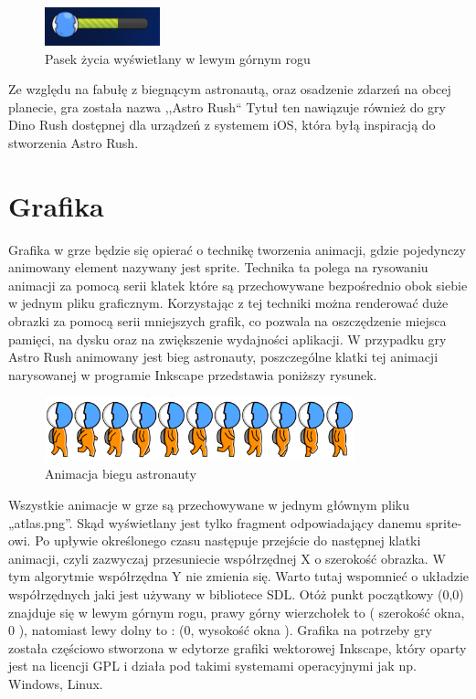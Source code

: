 \begin{figure}[h]
    \centering
    \includegraphics[height=42px]{./Pictures/livebar.png}
    \caption{Pasek życia wyświetlany w lewym górnym rogu}
\end{figure}

Ze względu na fabułę z biegnącym astronautą, oraz osadzenie zdarzeń na obcej planecie, gra została nazwa ,,Astro Rush`` Tytuł ten nawiązuje również do gry Dino Rush dostępnej dla urządzeń z systemem iOS, która byłą inspiracją do stworzenia Astro Rush.

\section{Grafika}

\hspace{1cm} Grafika w grze będzie się opierać o technikę tworzenia animacji, gdzie pojedynczy animowany element nazywany jest sprite. Technika ta polega na rysowaniu animacji za pomocą serii klatek które są przechowywane bezpośrednio obok siebie w jednym pliku graficznym. Korzystając z tej techniki można renderować duże obrazki za pomocą serii mniejszych grafik, co pozwala na oszczędzenie miejsca  pamięci, na dysku oraz na zwiększenie wydajności aplikacji. W przypadku gry Astro Rush animowany jest bieg astronauty, poszczególne klatki tej animacji narysowanej w programie Inkscape przedstawia poniższy rysunek.

\begin{figure}[h]
    \centering
    \includegraphics[width=0.8\textwidth,natwidth=410,natheight=142]{./Pictures/astroRun.jpg}
    \caption{Animacja biegu astronauty}
\end{figure}

Wszystkie animacje w grze są przechowywane w jednym głównym pliku „atlas.png”. Skąd wyświetlany jest tylko fragment odpowiadający danemu sprite-owi.
Po upływie określonego czasu następuje przejście do następnej klatki animacji, czyli zazwyczaj przesuniecie współrzędnej X o szerokość obrazka. W tym
algorytmie współrzędna Y nie zmienia się. Warto tutaj wspomnieć o układzie współrzędnych jaki jest używany w bibliotece SDL. Otóż punkt początkowy (0,0) znajduje się w lewym górnym
rogu, prawy górny wierzchołek to ( szerokość okna, 0 ), natomiast lewy dolny to : (0, wysokość okna ). Grafika na potrzeby gry została częściowo
stworzona w edytorze grafiki wektorowej Inkscape, który oparty jest na licencji GPL i działa pod takimi systemami operacyjnymi jak np. Windows, Linux.

